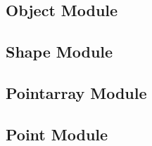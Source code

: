 \subsection{Object Module}
\subsection{Shape Module}
\subsection{Pointarray Module}
\subsection{Point Module}


